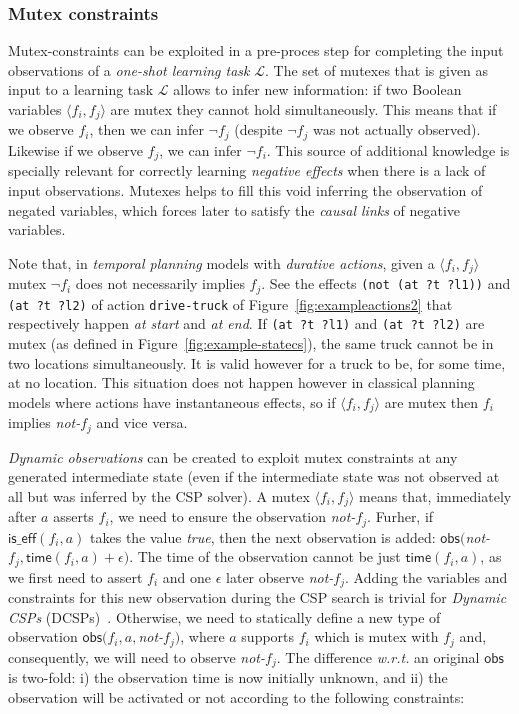 \documentclass{ecai}
\newcommand{\tup}[1]{{\langle #1 \rangle}}
\newcommand{\iseff}{\mathsf{is\_eff}}    %
\newcommand{\obs}{\mathsf{obs}}    %
\newcommand{\tim}{\mathsf{time}}   %
\begin{document}
\subsubsection{Mutex constraints}
Mutex-constraints can be exploited in a pre-proces step for completing the input observations of a {\em one-shot learning task} $\mathcal{L}$. The set of mutexes that is given as input to a learning task $\mathcal{L}$ allows to infer new information: if two Boolean variables $\tup{f_i, f_j}$ are mutex they cannot hold simultaneously. This means that if we observe $f_i$, then we can infer $\neg f_j$ (despite $\neg f_j$ was not actually observed). Likewise if we observe $f_j$, we can infer $\neg f_i$. This source of additional knowledge is specially relevant for correctly learning  {\em negative effects} when there is a lack of input observations. Mutexes helps to fill this void inferring the observation of negated variables, which forces later to satisfy the {\em causal links} of negative variables. 

Note that, in {\em temporal planning} models with {\em durative actions}, given a $\tup{f_i, f_j}$ mutex $\neg f_i$ does not necessarily implies $f_j$. See the effects \texttt{(not (at ?t ?l1))} and \texttt{(at ?t ?l2)} of action \texttt{drive-truck} of Figure~\ref{fig:exampleactions2} that respectively happen \textit{at start} and \textit{at end}. If \texttt{(at ?t ?l1)} and \texttt{(at ?t ?l2)} are mutex (as defined in Figure~\ref{fig:example-statecs}), the same truck cannot be in two locations simultaneously. It is valid however for a truck to be, for some time, at no location. This situation does not happen however in classical planning models where actions have instantaneous effects, so if $\tup{f_i, f_j}$ are mutex then $f_i$ implies \textit{not-}$f_j$ and vice versa.

{\em Dynamic observations} can be created to exploit mutex constraints at any generated intermediate state (even if the intermediate state was not observed at all but was inferred by the CSP solver). A mutex $\tup{f_i, f_j}$ means that, immediately after $a$ asserts $f_i$, we need to ensure the observation \textit{not-}$f_j$. Furher, if $\iseff(f_i,a)$ takes the value \textit{true}, then the next observation is added: $\obs($\textit{not-}$f_j,\tim(f_i,a)+\epsilon)$. The time of the observation cannot be just $\tim(f_i,a)$, as we first need to assert $f_i$ and one $\epsilon$ later observe \textit{not-}$f_j$. Adding the variables and constraints for this new observation during the CSP search is trivial for {\em Dynamic CSPs} (DCSPs)~\cite{mittal1990dynamic}. Otherwise, we need to statically define a new type of observation $\obs(f_i,a,$\textit{not-}$f_j)$, where $a$ supports $f_i$ which is mutex with $f_j$ and, consequently, we will need to observe \textit{not-}$f_j$. The difference \textit{w.r.t.} an original $\obs$ is two-fold: i) the observation time is now initially unknown, and ii) the observation will be activated or not according to the following constraints:
\newline
\end{document}
